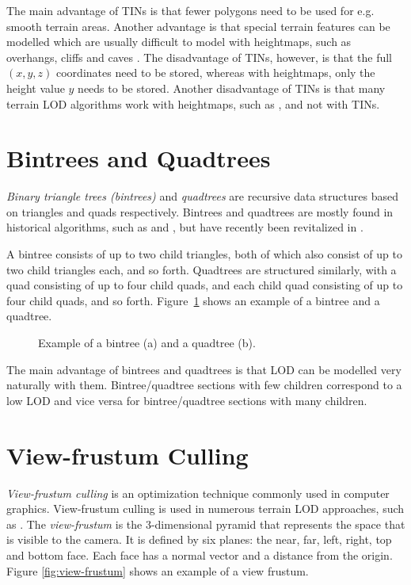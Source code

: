 The main advantage of TINs is that fewer polygons need to be used for 
e.g. smooth terrain areas. Another advantage is that
special terrain features can be modelled 
which are usually difficult to model with heightmaps, such as overhangs, cliffs and caves \cite{lodfor3dgraphics}.
The disadvantage of TINs, however, is that the full $(x,y,z)$ coordinates need to be stored,
whereas with heightmaps, only the height value $y$ needs to be stored.
Another disadvantage of TINs is that many terrain LOD algorithms work with 
heightmaps, such as \cite{roam,geomipmapping,rottgerpaper,geomclipmaps,gpugeomclipmaps,chunkedlod,cdlod,cbt}, and not with TINs.

\section{Bintrees and Quadtrees}
\textit{Binary triangle trees (bintrees)} and \textit{quadtrees} are 
recursive data structures based on triangles and quads respectively.
Bintrees and quadtrees are mostly found in historical algorithms,
such as \cite{lindstrom1996} and \cite{roam}, but have recently been revitalized in \cite{cbt}.

A bintree consists of up to two child triangles, both of which also consist of up to two child triangles each, and so forth.
Quadtrees are structured similarly, with a quad consisting of up to four child quads, and each child quad consisting
of up to four child quads, and so forth.
Figure~\ref{fig:bintree-quadtree-example} shows an example of a bintree and a quadtree.

\begin{figure}[H]
  \centering
  \qquad
  \caption{Example of a bintree (a) and a quadtree (b).}\label{fig:bintree-quadtree-example}
\end{figure}

The main advantage of bintrees and quadtrees is that 
LOD can be modelled very naturally with them.
Bintree/quadtree sections with few children correspond to a low LOD and 
vice versa for bintree/quadtree sections with many children.

\section{View-frustum Culling}
\textit{View-frustum culling} is an optimization technique commonly used in computer graphics.
View-frustum culling is used in numerous terrain LOD approaches, such as \cite{lindstrom1996,roam,geomipmapping,geomclipmaps,cdlod}.
The \textit{view-frustum} is the 3-dimensional pyramid that represents the space that is visible to the camera.
It is defined by six planes: the near, far, left, right, top and bottom face.
Each face has a normal vector and a distance from the origin. Figure \ref{fig:view-frustum} 
shows an example of a view frustum.

